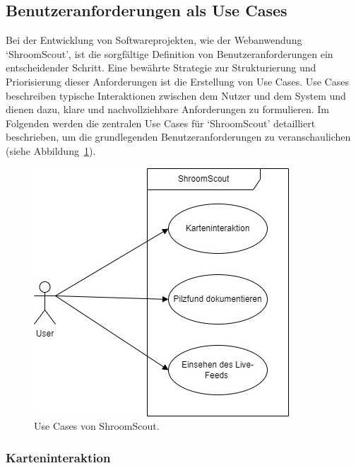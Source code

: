 \documentclass[../main.tex]{subfiles} %
\begin{document}
\subsection{Benutzeranforderungen als Use Cases} %

Bei der Entwicklung von Softwareprojekten, wie der Webanwendung `ShroomScout', ist die sorgfältige Definition von
Benutzeranforderungen ein entscheidender Schritt. Eine bewährte Strategie zur Strukturierung und Priorisierung dieser
Anforderungen ist die Erstellung von Use Cases. Use Cases beschreiben typische Interaktionen zwischen dem Nutzer und
dem System und dienen dazu, klare und nachvollziehbare Anforderungen zu formulieren. Im Folgenden werden die zentralen
Use Cases für `ShroomScout' detailliert beschrieben, um die grundlegenden Benutzeranforderungen zu veranschaulichen
(siehe Abbildung~\ref{fig:UseCase_Diagramm}).

\begin{figure}[htbp]
	\centering
	\includegraphics[width=\textwidth]{../abbildungen/UseCase_Diagramm_Drawio.jpg}
	\caption{Use Cases von ShroomScout.}\label{fig:UseCase_Diagramm}
\end{figure}

\subsubsection{Karteninteraktion}
\end{document}
